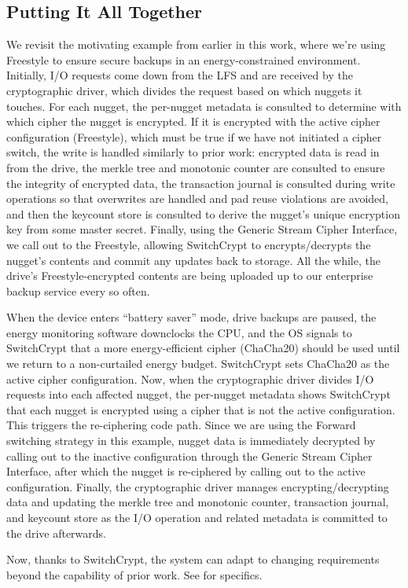 

\subsection{Putting It All Together} \label{subsec:summary}

We revisit the motivating example from earlier in this work, where we're using
Freestyle to ensure secure backups in an energy-constrained environment.
Initially, I/O requests come down from the LFS and are received by the
cryptographic driver, which divides the request based on which nuggets it
touches. For each nugget, the per-nugget metadata is consulted to determine with
which cipher the nugget is encrypted. If it is encrypted with the active cipher
configuration (Freestyle), which must be true if we have not initiated a cipher
switch, the write is handled similarly to prior work: encrypted data is read in
from the drive, the merkle tree and monotonic counter are consulted to ensure
the integrity of encrypted data, the transaction journal is consulted during
write operations so that overwrites are handled and pad reuse violations are
avoided, and then the keycount store is consulted to derive the nugget's unique
encryption key from some master secret. Finally, using the Generic Stream Cipher
Interface, we call out to the Freestyle, allowing SwitchCrypt to
encrypts/decrypts the nugget's contents and commit any updates back to storage.
All the while, the drive's Freestyle-encrypted contents are being uploaded up to
our enterprise backup service every so often.

When the device enters ``battery saver'' mode, drive backups are paused, the
energy monitoring software downclocks the CPU, and the OS signals to SwitchCrypt
that a more energy-efficient cipher (ChaCha20) should be used until we return to
a non-curtailed energy budget. SwitchCrypt sets ChaCha20 as the active cipher
configuration. Now, when the cryptographic driver divides I/O requests into each
affected nugget, the per-nugget metadata shows SwitchCrypt that each nugget is
encrypted using a cipher that is not the active configuration. This triggers the
re-ciphering code path. Since we are using the Forward switching strategy in
this example, nugget data is immediately decrypted by calling out to the
inactive configuration through the Generic Stream Cipher Interface, after which
the nugget is re-ciphered by calling out to the active configuration. Finally,
the cryptographic driver manages encrypting/decrypting data and updating the
merkle tree and monotonic counter, transaction journal, and keycount store as
the I/O operation and related metadata is committed to the drive afterwards.

Now, thanks to SwitchCrypt, the system can adapt to changing requirements beyond
the capability of prior work. See  for specifics.
